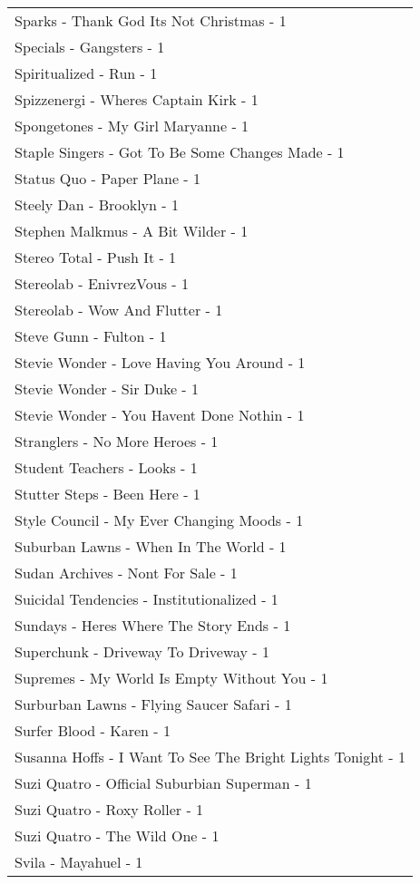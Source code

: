 \documentclass[
]{article}
\begin{document}
\begin{longtable}{l}
Sparks - Thank God Its Not Christmas - 1 \\ 
Specials - Gangsters - 1 \\ 
Spiritualized - Run - 1 \\ 
Spizzenergi - Wheres Captain Kirk - 1 \\ 
Spongetones - My Girl Maryanne - 1 \\ 
Staple Singers - Got To Be Some Changes Made - 1 \\ 
Status Quo - Paper Plane - 1 \\ 
Steely Dan - Brooklyn - 1 \\ 
Stephen Malkmus - A Bit Wilder - 1 \\ 
Stereo Total - Push It - 1 \\ 
Stereolab - EnivrezVous - 1 \\ 
Stereolab - Wow And Flutter - 1 \\ 
Steve Gunn - Fulton - 1 \\ 
Stevie Wonder - Love Having You Around - 1 \\ 
Stevie Wonder - Sir Duke - 1 \\ 
Stevie Wonder - You Havent Done Nothin - 1 \\ 
Stranglers - No More Heroes - 1 \\ 
Student Teachers - Looks - 1 \\ 
Stutter Steps - Been Here - 1 \\ 
Style Council - My Ever Changing Moods - 1 \\ 
Suburban Lawns - When In The World - 1 \\ 
Sudan Archives - Nont For Sale - 1 \\ 
Suicidal Tendencies - Institutionalized - 1 \\ 
Sundays - Heres Where The Story Ends - 1 \\ 
Superchunk - Driveway To Driveway - 1 \\ 
Supremes - My World Is Empty Without You - 1 \\ 
Surburban Lawns - Flying Saucer Safari - 1 \\ 
Surfer Blood - Karen - 1 \\ 
Susanna Hoffs - I Want To See The Bright Lights Tonight - 1 \\ 
Suzi Quatro - Official Suburbian Superman - 1 \\ 
Suzi Quatro - Roxy Roller - 1 \\ 
Suzi Quatro - The Wild One - 1 \\ 
Svila - Mayahuel - 1 \\ 

\end{longtable}
\end{document}
